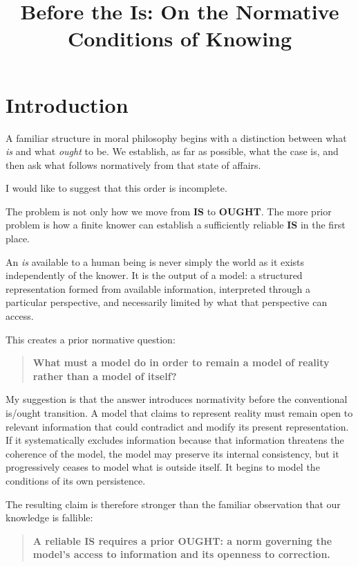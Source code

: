 \documentclass{article}
\title{Before the Is: On the Normative Conditions of Knowing}
\author{}
\date{}
\begin{document}
\maketitle

\section*{Introduction}

A familiar structure in moral philosophy begins with a distinction between what \textit{is} and what \textit{ought} to be. We establish, as far as possible, what the case is, and then ask what follows normatively from that state of affairs.

I would like to suggest that this order is incomplete.

The problem is not only how we move from \textbf{IS} to \textbf{OUGHT}. The more prior problem is how a finite knower can establish a sufficiently reliable \textbf{IS} in the first place.

An \textit{is} available to a human being is never simply the world as it exists independently of the knower. It is the output of a model: a structured representation formed from available information, interpreted through a particular perspective, and necessarily limited by what that perspective can access.

This creates a prior normative question:

\begin{quote}
    \textbf{What must a model do in order to remain a model of reality rather than a model of itself?}
\end{quote}

My suggestion is that the answer introduces normativity before the conventional is/ought transition. A model that claims to represent reality must remain open to relevant information that could contradict and modify its present representation. If it systematically excludes information because that information threatens the coherence of the model, the model may preserve its internal consistency, but it progressively ceases to model what is outside itself. It begins to model the conditions of its own persistence.

The resulting claim is therefore stronger than the familiar observation that our knowledge is fallible:

\begin{quote}
    \textbf{A reliable IS requires a prior OUGHT: a norm governing the model's access to information and its openness to correction.}
\end{quote}
\end{document}
